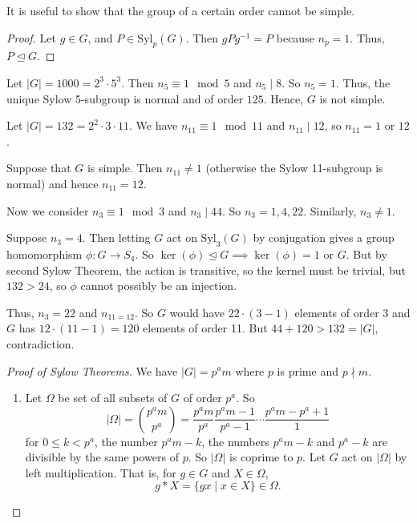 It is useful to show that the group of a certain order cannot be simple.
\begin{proof}
    Let \(g \in G\), and \(P \in \mathrm{Syl}_p(G)\). Then \(gPg^{-1} = P\) because \(n_p = 1\). Thus, \(P \trianglelefteq G\).
\end{proof}
\begin{example}
    Let \(\left\vert G \right\vert = 1000 = 2^3\cdot 5^3\). Then \(n_5 \equiv 1 \mod 5\) and \(n_5 \mid 8\). So \(n_5 = 1\). Thus, the unique Sylow 5-subgroup is normal and of order \(125\). Hence, \(G\) is not simple.
\end{example}
\begin{example}
    Let \(\left\vert G \right\vert = 132 = 2^2\cdot 3 \cdot 11\). We have \(n_{11}\equiv 1 \mod 11\) and \(n_{11}\mid 12\), so \(n_{11}=1\) or \(12\).

    Suppose that \(G\) is simple. Then \(n_{11} \neq 1\) (otherwise the Sylow 11-subgroup is normal) and hence \(n_{11} = 12\).

    Now we consider \(n_3 \equiv 1 \mod 3\) and \(n_3 \mid 44\). So \(n_3 = 1, 4, 22\). Similarly, \(n_3 \neq 1\).

    Suppose \(n_3 = 4\). Then letting \(G\) act on \(\mathrm{Syl}_{3}(G)\) by conjugation gives a group homomorphism \(\phi: G \to S_4\). So \(\ker (\phi) \trianglelefteq G \implies \ker(\phi)=1\) or \(G\). But by second Sylow Theorem, the action is transitive, so the kernel must be trivial, but \(132 > 24\), so \(\phi\) cannot possibly be an injection.

    Thus, \(n_{3} = 22\) and \(n_{11 = 12}\). So \(G\) would have \(22\cdot(3-1)\) elements of order 3 and \(G\) has \(12 \cdot (11-1) = 120\) elements of order 11. But \(44 + 120 > 132 = \left\vert G \right\vert \), contradiction.
\end{example}
\begin{proof}[Proof of Sylow Theorems]
    We have \(\left\vert G \right\vert = p^a m\) where \(p\) is prime and \(p\nmid m\).
    \begin{enumerate}
        \item Let \(\Omega\) be set of all subsets of \(G\) of order \(p^a\). So
        \[
            \left\vert \Omega \right\vert =\binom{p^a m}{p^a} = \frac{p^a m}{p^a} \frac{p^a m - 1}{p^a - 1}\cdots \frac{p^a m - p^a + 1}{1}
        \]
        for \(0 \leq k < p^a\), the number \(p^a m - k\), the numbers \(p^a m - k\) and \(p^a - k\) are divisible by the same powers of \(p\). So \(\left\vert \Omega \right\vert \) is coprime to \(p\). Let \(G\) act on \(\left\vert \Omega \right\vert \) by left multiplication. That is, for \(g \in G\) and \(X \in \Omega\),
        \[g * X = \{gx \mid x \in X\} \in \Omega.\]
    \end{enumerate}
\end{proof}